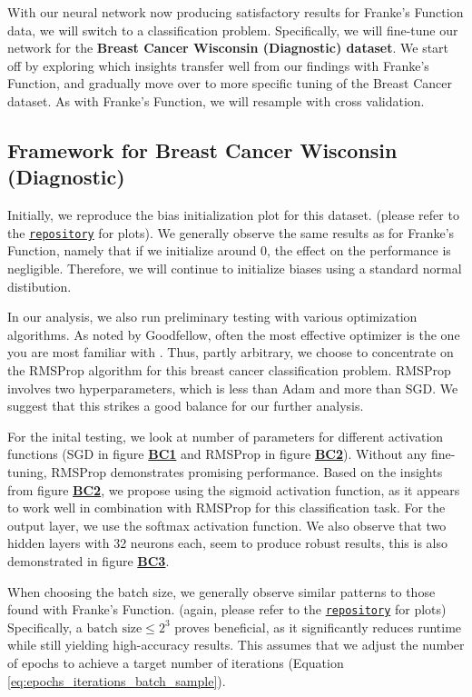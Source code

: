 \documentclass{article}
\begin{document}
\begin{multicols}{2}

With our neural network now producing satisfactory results for Franke's Function data, we will switch to a classification problem. Specifically, we will fine-tune our network for the \textbf{Breast Cancer Wisconsin (Diagnostic) dataset}. We start off by exploring which insights transfer well from our findings with Franke's Function, and gradually move over to more specific tuning of the Breast Cancer dataset. As with Franke's Function, we will resample with cross validation.

\subsection*{Framework for Breast Cancer Wisconsin (Diagnostic)}
Initially, we reproduce the bias initialization plot for this dataset. (please refer to the \href{https://github.com/EOH-ML/FYS-STK3155-Projects/tree/main/project2}{\texttt{repository}} for plots).  We generally observe the same results as for Franke's Function, namely that if we initialize around $0$, the effect on the performance is negligible. Therefore, we will continue to initialize biases using a standard normal distibution. 

In our analysis, we also run preliminary testing with various optimization algorithms. As noted by Goodfellow, often the most effective optimizer is the one you are most familiar with \cite{goodfellow_deep_2016}. Thus, partly arbitrary, we choose to concentrate on the RMSProp algorithm for this breast cancer classification problem. RMSProp involves two hyperparameters, which is less than Adam and more than SGD. We suggest that this strikes a good balance for our further analysis. 

For the inital testing, we look at number of parameters for different activation functions (SGD in figure \hyperref[fig:BC1]{\textbf{BC1}} and RMSProp in figure \hyperref[fig:BC2]{\textbf{BC2}}). Without any fine-tuning, RMSProp demonstrates promising performance. Based on the insights from figure \hyperref[fig:BC2]{\textbf{BC2}}, we propose using the sigmoid activation function, as it appears to work well in combination with RMSProp for this classification task. For the output layer, we use  the softmax activation function.  We also observe that two hidden layers with 32 neurons each, seem to produce robust results, this is also demonstrated in figure \hyperref[fig:BC3]{\textbf{BC3}}.

When choosing the batch size, we generally observe similar patterns to those found with Franke's Function. (again, please refer to the \href{https://github.com/EOH-ML/FYS-STK3155-Projects/tree/main/project2}{\texttt{repository}} for plots) Specifically, a $\text{batch size} \leq 2^3$ proves beneficial, as it significantly reduces runtime while still yielding high-accuracy results. This assumes that we adjust the number of epochs to achieve a target number of iterations (Equation \ref{eq:epochs_iterations_batch_sample}).


\end{multicols}
\end{document}
